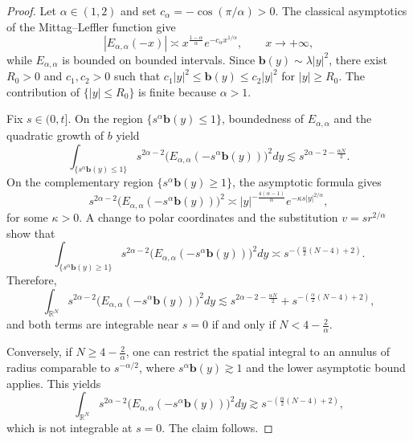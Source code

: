 \documentclass[10pt,a4paper]{amsart}
\newcommand{\R}{\ensuremath{\mathbb{R}}}
\begin{document}
\begin{proof}
Let $\alpha\in(1,2)$ and set $c_\alpha=-\cos(\pi/\alpha)>0$. The classical asymptotics of the Mittag--Leffler function give
\[
|E_{\alpha,\alpha}(-x)|\asymp x^{\frac{1-\alpha}{\alpha}}e^{-c_\alpha x^{1/\alpha}},
\qquad x\to+\infty,
\]
while $E_{\alpha,\alpha}$ is bounded on bounded intervals. Since $\mathbf{b}(y)\sim\lambda|y|^2$, there exist $R_0>0$ and $c_1,c_2>0$ such that
$c_1|y|^2\le \mathbf{b}(y)\le c_2|y|^2$ for $|y|\ge R_0$. The contribution of $\{|y|\le R_0\}$ is finite because $\alpha>1$.

Fix $s\in(0,t]$. On the region $\{s^\alpha \mathbf{b}(y)\le1\}$, boundedness of $E_{\alpha,\alpha}$ and the quadratic growth of $b$ yield
\[
\int_{\{s^\alpha \mathbf{b}(y)\le1\}} s^{2\alpha-2}\bigl(E_{\alpha,\alpha}(-s^\alpha \mathbf{b}(y))\bigr)^2dy
\lesssim s^{2\alpha-2-\frac{\alpha N}{2}}.
\]
On the complementary region $\{s^\alpha \mathbf{b}(y)\ge1\}$, the asymptotic formula gives
\[
s^{2\alpha-2}\bigl(E_{\alpha,\alpha}(-s^\alpha \mathbf{b}(y))\bigr)^2
\asymp |y|^{-\frac{4(\alpha-1)}{\alpha}}
e^{-\kappa s|y|^{2/\alpha}},
\]
for some $\kappa>0$. A change to polar coordinates and the substitution
$v=s r^{2/\alpha}$ show that
\[
\int_{\{s^\alpha \mathbf{b}(y)\ge1\}} s^{2\alpha-2}
\bigl(E_{\alpha,\alpha}(-s^\alpha \mathbf{b}(y))\bigr)^2dy
\asymp s^{-\left(\frac{\alpha}{2}(N-4)+2\right)}.
\]
Therefore,
\[
\int_{\R^N} s^{2\alpha-2}\bigl(E_{\alpha,\alpha}(-s^\alpha \mathbf{b}(y))\bigr)^2dy
\lesssim
s^{2\alpha-2-\frac{\alpha N}{2}}
+
s^{-\left(\frac{\alpha}{2}(N-4)+2\right)},
\]
and both terms are integrable near $s=0$ if and only if $N<4-\frac{2}{\alpha}$.

Conversely, if $N\ge 4-\frac{2}{\alpha}$, one can restrict the spatial integral to an annulus of radius comparable to $s^{-\alpha/2}$, where $s^\alpha \mathbf{b}(y)\gtrsim1$ and the lower asymptotic bound applies. This yields
\[
\int_{\R^N} s^{2\alpha-2}\bigl(E_{\alpha,\alpha}(-s^\alpha \mathbf{b}(y))\bigr)^2dy
\gtrsim s^{-\left(\frac{\alpha}{2}(N-4)+2\right)},
\]
which is not integrable at $s=0$. The claim follows.
\end{proof}
\end{document}
